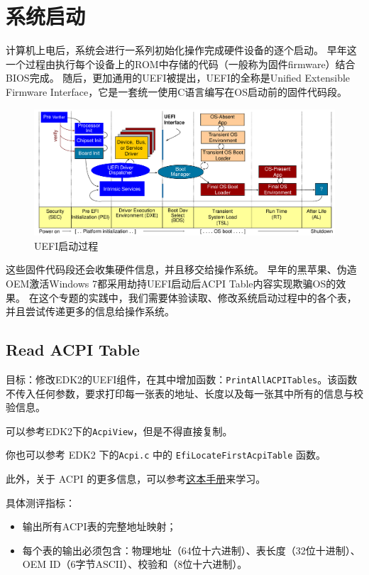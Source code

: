 \chapter{系统启动}
计算机上电后，系统会进行一系列初始化操作完成硬件设备的逐个启动。
早年这一个过程由执行每个设备上的ROM中存储的代码（一般称为固件firmware）结合BIOS完成。
随后，更加通用的UEFI被提出，UEFI的全称是Unified Extensible Firmware Interface，它是一套统一使用C语言编写在OS启动前的固件代码段。

\begin{figure}[h]
    \centering
    \includegraphics[width=\linewidth]{figure/mixed-figures/boot.pdf}
    \caption{UEFI启动过程}
    \label{fig:enter-label}
\end{figure}

这些固件代码段还会收集硬件信息，并且移交给操作系统。
早年的黑苹果、伪造OEM激活Windows 7都采用劫持UEFI启动后ACPI Table内容实现欺骗OS的效果。
在这个专题的实践中，我们需要体验读取、修改系统启动过程中的各个表，并且尝试传递更多的信息给操作系统。

\section{Read ACPI Table}
目标：修改EDK2的UEFI组件，在其中增加函数：\texttt{PrintAllACPITables}。该函数不传入任何参数，要求打印每一张表的地址、长度以及每一张其中所有的信息与校验信息。

可以参考EDK2下的\texttt{AcpiView}，但是不得直接复制。

你也可以参考 EDK2 下的\texttt{Acpi.c} 中的 \texttt{EfiLocateFirstAcpiTable} 函数。

此外，关于 ACPI 的更多信息，可以参考\href{https://uefi.org/sites/default/files/resources/ACPI_Spec_6.5a_Final.pdf}{这本手册}来学习。

具体测评指标：
\begin{itemize}
\item 输出所有ACPI表的完整地址映射；
\item 每个表的输出必须包含：物理地址（64位十六进制）、表长度（32位十进制）、OEM ID（6字节ASCII）、校验和（8位十六进制）。
\end{itemize}

